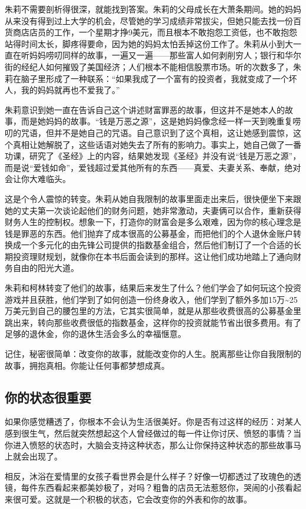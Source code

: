朱莉不需要剖析得很深，就能找到答案。朱莉的父母成长在大萧条期间。她的妈妈从来没有得到过上大学的机会，尽管她的学习成绩非常拔尖，但她只能去找一份百货商店店员的工作，一个星期才挣9美元，而且根本不敢抱怨工资低，也不敢抱怨站得时间太长，脚疼得要命，因为她的妈妈太怕丢掉这份工作了。朱莉从小到大一直在听妈妈唠叨同样的故事，一遍又一遍——那些富人如何剥削穷人；银行和华尔街的经纪人如何摧毁了美国经济；人们根本不能相信股票市场。听的次数多了，朱莉在脑子里形成了一种联系：“如果我成了一个富有的投资者，我就变成了一个坏人，我的妈妈就再也不爱我了。”

朱莉意识到她一直在告诉自己这个讲述财富罪恶的故事，但这并不是她本人的故事，而是她妈妈的故事。“钱是万恶之源”，这是她妈妈像念经一样一天到晚重复唠叨的咒语，但并不是她自己的咒语。自己意识到了这个真相，这让她感到震惊，这个真相让她解脱了，这些话语对她失去了所有的影响力。事实上，她自己做了一番功课，研究了《圣经》上的内容，结果她发现《圣经》并没有说“钱是万恶之源”，而是说“爱钱如命”，爱钱超过爱其他所有的东西——真爱、夫妻关系、奉献，绝对会让你大难临头。

这是个令人震惊的转变。朱莉从她自我限制的故事里面走出来后，很快便坐下来跟她的丈夫第一次谈论起他们的财务问题，她非常激动，夫妻俩可以合作，重新获得财务人生的控制权。想象一下，打造你的财富会是多么艰难，因为你的核心理念是钱是罪恶的东西。他们抛弃了成本很高的公募基金，而把他们的个人退休金账户转换成一个多元化的由先锋公司提供的指数基金组合，然后他们制订了一个合适的长期投资理财规划，就像你在本书后面会读到的那样。这让他们成功地踏上了通向财务自由的阳光大道。

朱莉和柯林转变了他们的故事，结果后来发生了什么？他们学会了如何玩这个投资游戏并且获胜，他们学到了如何创造一份终身收入，他们学到了额外多加15万\textasciitilde{}25万美元到自己的腰包里的方法，它其实很简单，就是从那些收费很高的公募基金里跳出来，转向那些收费很低的指数基金，这样你的投资就能节省出很多费用。有了足够的退休金，你的退休生活会多么的幸福惬意。

记住，秘密很简单：改变你的故事，就能改变你的人生。脱离那些让你自我限制的故事，拥抱真相。你能让任何事都梦想成真。

\subsection{你的状态很重要}

如果你感觉糟透了，你根本不会认为生活很美好。你是否有过这样的经历：对某人感到很生气，然后就突然想起这个人曾经做过的每一件让你讨厌、愤怒的事情？当你进入愤怒的状态时，大脑会支持这种状态，那么让你保持这种状态的那些故事马上就会出现了。

相反，沐浴在爱情里的女孩子看世界会是什么样子？好像一切都透过了玫瑰色的透镜，每件东西看起来都美妙极了，对吗？粗鲁的店员无法惹怒你，哭闹的小孩看起来很可爱。这就是一个积极的状态，它会改变你的外表和你的故事。

